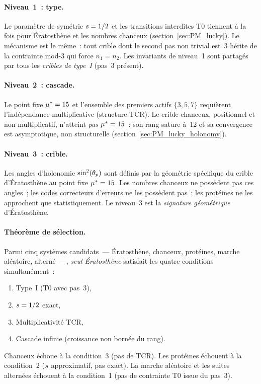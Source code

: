 \documentclass[12pt,a4paper]{article}
\begin{document}
\paragraph{Niveau~1~: type.}
Le paramètre de symétrie $s = 1/2$ et les transitions interdites
T0 tiennent à la fois pour Ératosthène et les nombres chanceux
(section~\ref{sec:PM_lucky}). Le mécanisme est le même~: tout crible
dont le second pas non trivial est~3 hérite de la contrainte mod-3
qui force $n_1 = n_2$. Les invariants de niveau~1 sont partagés par
tous les \emph{cribles de type~I} (pas~3 présent).

\paragraph{Niveau~2~: cascade.}
Le point fixe ${\mu^{*}} = 15$ et l'ensemble des premiers actifs
$\{3,5,7\}$ requièrent l'indépendance multiplicative (structure TCR).
Le crible chanceux, positionnel et non multiplicatif, n'atteint
\emph{pas} ${\mu^{*}} = 15$~: son rang sature à~12 et sa convergence
est asymptotique, non structurelle
(section~\ref{sec:PM_lucky_holonomy}).

\paragraph{Niveau~3~: crible.}
Les angles d'holonomie $\sin^2(\theta_{p})$ sont définis par la géométrie
spécifique du crible d'Ératosthène au point fixe ${\mu^{*}} = 15$. Les
nombres chanceux ne possèdent pas ces angles~; les codes correcteurs
d'erreurs ne les possèdent pas~; les protéines ne les approchent que
statistiquement. Le niveau~3 est la \emph{signature géométrique}
d'Ératosthène.

\paragraph{Théorème de sélection.}
\mTHM
Parmi cinq systèmes candidats~--- Ératosthène, chanceux, protéines,
marche aléatoire, alterné~---, \emph{seul Ératosthène} satisfait les
quatre conditions simultanément~:
\begin{enumerate}[nosep]
  \item Type~I (T0 avec pas~3),
  \item $s = 1/2$ exact,
  \item Multiplicativité TCR,
  \item Cascade infinie (croissance non bornée du rang).
\end{enumerate}
Chanceux échoue à la condition~3 (pas de TCR). Les protéines
échouent à la condition~2 ($s$ approximatif, pas exact). La
marche aléatoire et les suites alternées échouent à la condition~1
(pas de contrainte T0 issue du pas~3).
\end{document}
